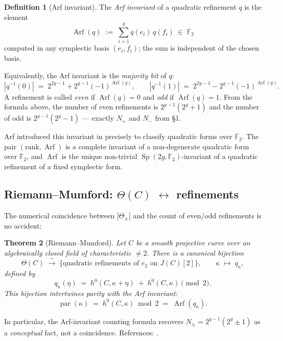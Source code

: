 \documentclass[11pt]{amsart}
\theoremstyle{plain}
\newtheorem{theorem}{Theorem}[section]
\theoremstyle{definition}
\newtheorem{definition}[theorem]{Definition}
\theoremstyle{remark}
\newcommand{\Sp}{\operatorname{Sp}}
\newcommand{\Arf}{\operatorname{Arf}}
\newcommand{\Parity}{\operatorname{par}}
\newcommand{\F}{\mathbb F}
\begin{document}
\begin{definition}[Arf invariant]
The \emph{Arf invariant} of a quadratic refinement $q$ is the element
\[
  \Arf(q) \;:=\; \sum_{i=1}^{g} q(e_i)\,q(f_i) \;\in\; \F_2
\]
computed in any symplectic basis $(e_i, f_i)$; the sum is independent of the
chosen basis.
\end{definition}

Equivalently, the Arf invariant is the \emph{majority bit} of $q$:
\[
  |q^{-1}(0)| \;=\; 2^{2g-1} + 2^{g-1}(-1)^{\Arf(q)},
  \qquad
  |q^{-1}(1)| \;=\; 2^{2g-1} - 2^{g-1}(-1)^{\Arf(q)}.
\]
A refinement is called \emph{even} if $\Arf(q) = 0$ and \emph{odd} if
$\Arf(q) = 1$. From the formula above, the number of even refinements is
$2^{g-1}(2^g + 1)$ and the number of odd is $2^{g-1}(2^g - 1)$ --- exactly
$N_+$ and $N_-$ from \S 1.

Arf introduced this invariant in \cite{Arf1941} precisely to classify
quadratic forms over $\F_2$. The pair $(\mathrm{rank}, \Arf)$ is a complete
invariant of a non-degenerate quadratic form over $\F_2$, and $\Arf$ is the
unique non-trivial $\Sp(2g, \F_2)$-invariant of a quadratic refinement of a
fixed symplectic form.

\subsection{Riemann--Mumford: $\Theta(C)$ $\leftrightarrow$ refinements}

The numerical coincidence between $|\Theta_\pm|$ and the count of even/odd
refinements is no accident:

\begin{theorem}[Riemann--Mumford]\label{thm:RM}
Let $C$ be a smooth projective curve over an algebraically closed field of
characteristic $\ne 2$. There is a canonical bijection
\[
  \Theta(C) \;\xrightarrow{\;\sim\;}\;
  \bigl\{\text{quadratic refinements of } e_2 \text{ on } J(C)[2]\bigr\},
  \qquad \kappa \;\longmapsto\; q_\kappa,
\]
defined by
\[
  q_\kappa(\eta) \;=\; h^0(C, \kappa + \eta) \;+\; h^0(C, \kappa) \pmod 2.
\]
This bijection intertwines parity with the Arf invariant:
\[
  \Parity(\kappa) \;=\; h^0(C, \kappa) \bmod 2 \;=\; \Arf(q_\kappa).
\]
\end{theorem}

In particular, the Arf-invariant counting formula recovers
$N_\pm = 2^{g-1}(2^g \pm 1)$ as a \emph{conceptual} fact, not a coincidence.
References: \cite{Riemann1857,Mumford1971,Atiyah1971,Dolgachev2012}.
\end{document}
